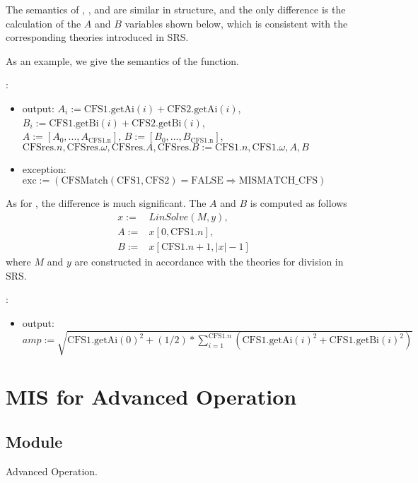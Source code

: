 \documentclass[12pt, titlepage]{article}
\begin{document}
The semantics of , , and  are similar in structure, and the only difference is the calculation of the $A$ and $B$ variables shown below, which is consistent with the corresponding theories introduced in SRS.

As an example, we give the semantics of the  function.

\noindent {}:
\begin{itemize}
	\item output: $A_i:=\text{CFS1}.\text{getAi}(i)+\text{CFS2}.\text{getAi}(i)$,
	$B_i:=\text{CFS1}.\text{getBi}(i)+\text{CFS2}.\text{getBi}(i)$,\\
	$A:=[A_0, ..., A_{\text{CFS1.n}}]$, $B:=[B_0, ..., B_{\text{CFS1.n}}]$,\\
	$\text{CFSres}.n, \text{CFSres}.\omega, \text{CFSres}.A, \text{CFSres}.B:=\text{CFS1}.n, \text{CFS1}.\omega, A, B$
	\item exception: $\text{exc}:=(\text{CFSMatch}(\text{CFS1}, \text{CFS2})=\text{FALSE}\Rightarrow\text{MISMATCH\_CFS})$
\end{itemize}

As for , the difference is much significant. The $A$ and $B$ is computed as follows
\begin{align*}
	x:=&LinSolve(M, y),\\
	A:=&x[0,\text{CFS1}.n],\\
	B:=&x[\text{CFS1}.n+1, |x|-1]
\end{align*}
where $M$ and $y$ are constructed in accordance with the theories for division in SRS.

\noindent {}:
\begin{itemize} 
	\item output: $amp:=\sqrt{\text{CFS1}.\text{getAi}(0)^2+(1/2)*\sum_{i=1}^{\text{CFS1}.n}(\text{CFS1}.\text{getAi}(i)^2+\text{CFS1}.\text{getBi}(i)^2)}$ 
\end{itemize}

\section{MIS for Advanced Operation}
\subsection{Module}
Advanced Operation.
\end{document}
